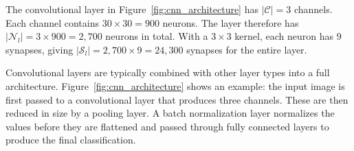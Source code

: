 \documentclass[
12pt,
fancyheadings,
a4paper,
twoside,
BCOR=0.7cm,
nobcorignoretitle,
grayscalebody,
]{stsreprt}
\begin{document}
The convolutional layer in Figure~\ref{fig:cnn_architecture} has $|\mathcal{C}| = 3$ channels.
Each channel contains $30 \times 30 = 900$ neurons.
The layer therefore has $|\mathcal{N}_l| = 3 \times 900 = 2{,}700$ neurons in total.
With a $3 \times 3$ kernel, each neuron has $9$ synapses, giving $|\mathcal{S}_l| = 2{,}700 \times
9 = 24{,}300$ synapses for the entire layer.

Convolutional layers are typically combined with other layer types into a full architecture.
Figure~\ref{fig:cnn_architecture} shows an example: the input image is first passed to a
convolutional layer that produces three channels.
These are then reduced in size by a pooling layer.
A batch normalization layer normalizes the values before they are flattened and passed through
fully connected layers to produce the final classification.
\end{document}
